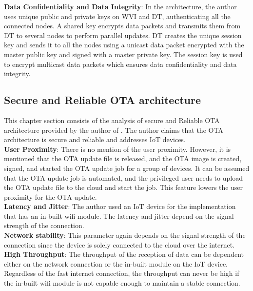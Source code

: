 \documentclass[12pt,a4paper]{article}
\begin{document}
{\textbf{Data Confidentiality and Data Integrity}: In the architecture, the author uses unique public and private keys on WVI and DT, authenticating all the connected nodes. A shared key encrypts data packets and transmits them from DT to several nodes to perform parallel updates. DT creates the unique session key and sends it to all the nodes using a unicast data packet encrypted with the master public key and signed with a master private key. The session key is used to encrypt multicast data packets which ensures data confidentiality and data integrity. \cite{r3}

\subsection{Secure and Reliable OTA architecture}

This chapter section consists of the analysis of secure and Reliable OTA architecture provided by the author of \cite{r27}. The author claims that the OTA architecture is secure and reliable and addresses IoT devices. \\

\textbf{User Proximity}: There is no mention of the user proximity. However, it is mentioned that the OTA update file is released, and the OTA image is created, signed, and started the OTA update job for a group of devices. It can be assumed that the OTA update job is automated, and the privileged user needs to upload the OTA update file to the cloud and start the job. This feature lowers the user proximity for the OTA update. \cite{r27} \\

\textbf{Latency and Jitter}: The author used an IoT device for the implementation that has an in-built wifi module. The latency and jitter depend on the signal strength of the connection. \\

\textbf{Network stability}: This parameter again depends on the signal strength of the connection since the device is solely connected to the cloud over the internet. \\

\textbf{High Throughput}: The throughput of the reception of data can be dependent either on the network connection or the in-built module on the IoT device. Regardless of the fast internet connection, the throughput can never be high if the in-built wifi module is not capable enough to maintain a stable connection. \\

}
\end{document}
